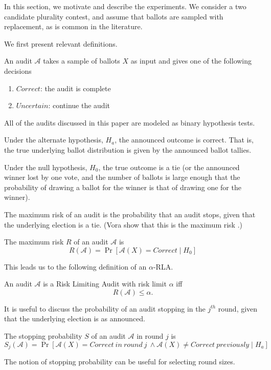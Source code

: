 In this section, we motivate and describe the experiments. We consider a two candidate plurality contest, and assume that ballots are sampled with replacement, as is common in the literature. 

We first present relevant definitions.

\begin{definition}
An audit $\mathcal{A}$ takes a sample of ballots $X$ as input and gives one of the 
following decisions
\begin{enumerate}
\item
$Correct$: the audit is complete
\item
$Uncertain$: continue the audit
\end{enumerate}
\end{definition}

All of the audits discussed in this paper are modeled as binary hypothesis tests.

Under the alternate hypothesis, $H_a$, the announced outcome is correct. 
That is, the true underlying ballot distribution is given by the announced ballot tallies.

Under the null hypothesis, $H_0$, the true outcome is a tie 
(or the announced winner lost by one vote, and the number of ballots is large enough that the probability of drawing a ballot for the winner is that of drawing one for the winner).

The maximum risk of an audit is the probability that an audit stops, given that the underlying election is a tie. (Vora show that this is the maximum risk \cite{Bayesian-RLA}.) 
\begin{definition}[Risk]
The maximum risk $R$ of an audit $\mathcal{A}$ is
$$R(\mathcal{A})=\Pr[\mathcal{A}(X)=Correct \mid H_0]$$
\end{definition}

This leads us to the following definition of an $\alpha$-RLA.
\begin{definition}
An audit $\mathcal{A}$ is a Risk Limiting Audit with 
risk limit $\alpha$ iff 
$$R(\mathcal{A}) \le \alpha.$$
\end{definition}

It is useful to discuss the probability of an audit stopping in
the $j^{th}$ round, given that the underlying election is as announced.
\begin{definition}
The stopping probability $S$ of an audit $\mathcal{A}$ in round $j$ is 
$$S_j(\mathcal{A})=\Pr[\mathcal{A}(X)=Correct ~in~round~j~\land \mathcal{A}(X) \neq Correct ~previously \mid H_a]$$
\end{definition}
The notion of stopping probability can be useful for selecting round sizes.

